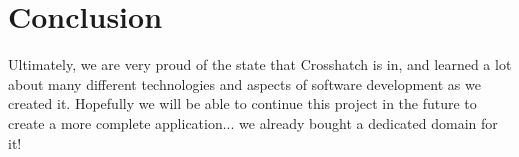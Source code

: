 \documentclass{article}
\begin{document}
\section{Conclusion}
Ultimately, we are very proud of the state that Crosshatch is in, and learned a lot about many different technologies and aspects of software development as we created it. Hopefully we will be able to continue this project in the future to create a more complete application... we already bought a dedicated domain for it!



\newpage


\end{document}
